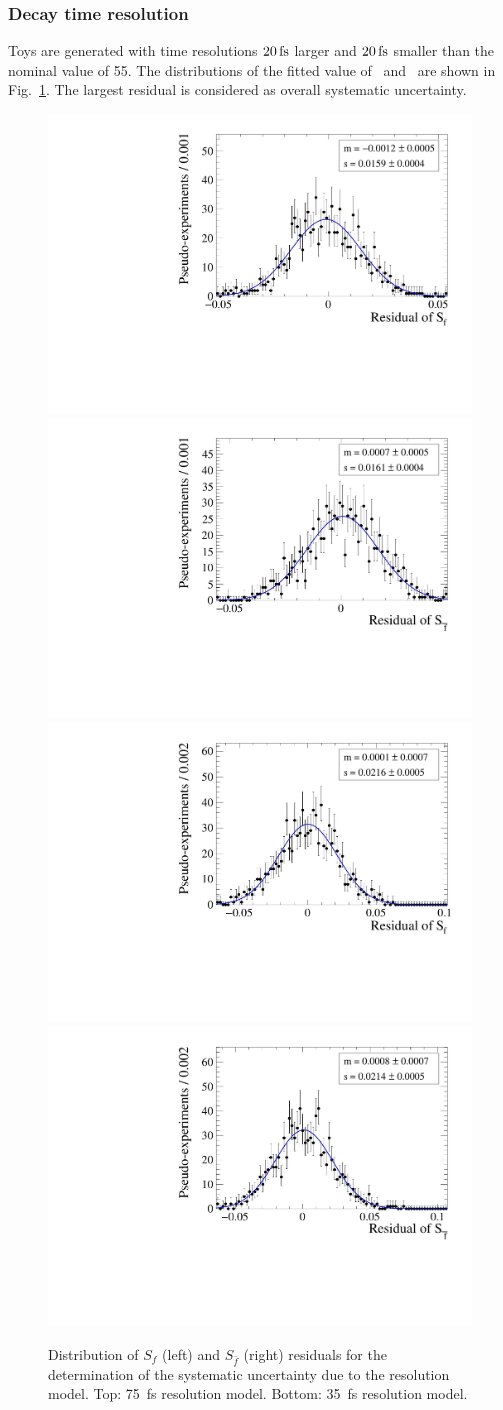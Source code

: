 \subsubsection{Decay time resolution}
\label{sec:syst_toys_resolution}
Toys are generated with time resolutions $20\rm \,fs$ larger and $20\rm \,fs$ smaller than the nominal value of 55\fs.
The distributions of the fitted value of \Sf~and \Sfb~are shown in Fig.~\ref{fig:ToysAllFixedCPloRes}.
The largest residual is considered as overall systematic uncertainty.
\begin{figure}[t]
        \begin{center}
                \includegraphics[width=0.4\linewidth]{06Systematics/figs/ResHigh_Sf_res.pdf}
                \includegraphics[width=0.4\linewidth]{06Systematics/figs/ResHigh_Sfbar_res.pdf} \\
                \includegraphics[width=0.4\linewidth]{06Systematics/figs/ResLow_Sf_res.pdf}
                \includegraphics[width=0.4\linewidth]{06Systematics/figs/ResLow_Sfbar_res.pdf}
                \end{center}
        \vspace{-2mm}
        \caption{Distribution of $S_f$ (left) and $S_{\bar f}$ (right) residuals for the determination of the systematic uncertainty due
        to the resolution model. Top: \SI{75}{\fs} resolution model. Bottom: \SI{35}{\fs} resolution
        model. }
        \label{fig:ToysAllFixedCPloRes}
\end{figure}

